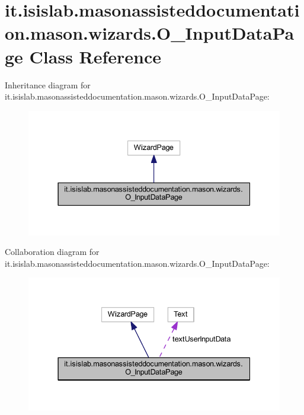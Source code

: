 \hypertarget{classit_1_1isislab_1_1masonassisteddocumentation_1_1mason_1_1wizards_1_1_o___input_data_page}{\section{it.\-isislab.\-masonassisteddocumentation.\-mason.\-wizards.\-O\-\_\-\-Input\-Data\-Page Class Reference}
\label{classit_1_1isislab_1_1masonassisteddocumentation_1_1mason_1_1wizards_1_1_o___input_data_page}
}


Inheritance diagram for it.\-isislab.\-masonassisteddocumentation.\-mason.\-wizards.\-O\-\_\-\-Input\-Data\-Page\-:\nopagebreak
\begin{figure}[H]
\begin{center}
\leavevmode
\includegraphics[width=337pt]{classit_1_1isislab_1_1masonassisteddocumentation_1_1mason_1_1wizards_1_1_o___input_data_page__inherit__graph}
\end{center}
\end{figure}


Collaboration diagram for it.\-isislab.\-masonassisteddocumentation.\-mason.\-wizards.\-O\-\_\-\-Input\-Data\-Page\-:\nopagebreak
\begin{figure}[H]
\begin{center}
\leavevmode
\includegraphics[width=337pt]{classit_1_1isislab_1_1masonassisteddocumentation_1_1mason_1_1wizards_1_1_o___input_data_page__coll__graph}
\end{center}
\end{figure}

